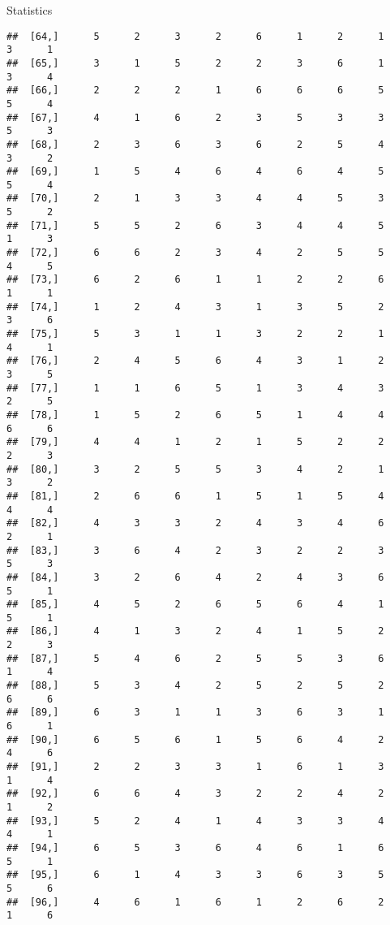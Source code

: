\documentclass[
  ignorenonframetext,
]{beamer}
\begin{document}
\begin{frame}[fragile]{Statistics}
\begin{verbatim}
##  [64,]      5      2      3      2      6      1      2      1      3      1
##  [65,]      3      1      5      2      2      3      6      1      3      4
##  [66,]      2      2      2      1      6      6      6      5      5      4
##  [67,]      4      1      6      2      3      5      3      3      5      3
##  [68,]      2      3      6      3      6      2      5      4      3      2
##  [69,]      1      5      4      6      4      6      4      5      5      4
##  [70,]      2      1      3      3      4      4      5      3      5      2
##  [71,]      5      5      2      6      3      4      4      5      1      3
##  [72,]      6      6      2      3      4      2      5      5      4      5
##  [73,]      6      2      6      1      1      2      2      6      1      1
##  [74,]      1      2      4      3      1      3      5      2      3      6
##  [75,]      5      3      1      1      3      2      2      1      4      1
##  [76,]      2      4      5      6      4      3      1      2      3      5
##  [77,]      1      1      6      5      1      3      4      3      2      5
##  [78,]      1      5      2      6      5      1      4      4      6      6
##  [79,]      4      4      1      2      1      5      2      2      2      3
##  [80,]      3      2      5      5      3      4      2      1      3      2
##  [81,]      2      6      6      1      5      1      5      4      4      4
##  [82,]      4      3      3      2      4      3      4      6      2      1
##  [83,]      3      6      4      2      3      2      2      3      5      3
##  [84,]      3      2      6      4      2      4      3      6      5      1
##  [85,]      4      5      2      6      5      6      4      1      5      1
##  [86,]      4      1      3      2      4      1      5      2      2      3
##  [87,]      5      4      6      2      5      5      3      6      1      4
##  [88,]      5      3      4      2      5      2      5      2      6      6
##  [89,]      6      3      1      1      3      6      3      1      6      1
##  [90,]      6      5      6      1      5      6      4      2      4      6
##  [91,]      2      2      3      3      1      6      1      3      1      4
##  [92,]      6      6      4      3      2      2      4      2      1      2
##  [93,]      5      2      4      1      4      3      3      4      4      1
##  [94,]      6      5      3      6      4      6      1      6      5      1
##  [95,]      6      1      4      3      3      6      3      5      5      6
##  [96,]      4      6      1      6      1      2      6      2      1      6

\end{verbatim}
\end{frame}
\end{document}

